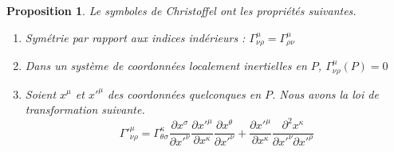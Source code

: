\documentclass[a4paper,11pt]{report}
\theoremstyle{definition}
\theoremstyle{plain}
\newtheorem{prop}[thm]{Proposition}
\theoremstyle{definition}
\theoremstyle{remark}
\newcommand{\p}{\partial}
\begin{document}
            \begin{prop}\label{prop:propgamma}
                Le symboles de Christoffel ont les propriétés suivantes.
                \begin{enumerate}[label = \textit{\roman*)}]
                    \item Symétrie par rapport aux indices indérieurs : $\Gamma^\mu_{\nu\rho}=\Gamma^\mu_{\rho\nu}$
                    \item Dans un système de coordonnées localement inertielles en $P$, $\Gamma^\mu_{\nu\rho}(P) = 0$
                    \item Soient $x^\mu$ et $x'^\mu$ des coordonnées quelconques en $P$. Nous avons la loi de transformation suivante.
                    \begin{equation}
                        \Gamma'^\mu_{\nu\rho} = \Gamma^\kappa_{\theta\sigma}\frac{\p x^\sigma}{\p x'^\nu} \frac{\p x'^\mu}{\p x^\kappa}\frac{\p x^\theta}{\p x'^\nu} +  \frac{\p x'^\mu}{\p x^\kappa}\frac{\p^2 x^\kappa}{\p x'^\nu\p x'^\rho}
                    \end{equation}
                \end{enumerate}
            \end{prop}
            
\end{document}
